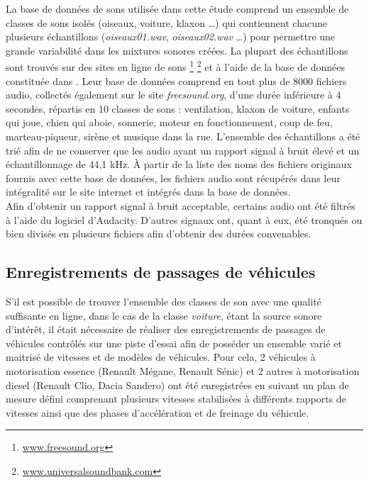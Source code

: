 La base de données de sons utilisée dans cette étude comprend un ensemble de classes de sons isolés (oiseaux, voiture, klaxon  \dots) qui contiennent chacune plusieurs échantillons (\textit{oiseaux01.wav}, \textit{oiseaux02.wav} \dots) pour permettre une grande variabilité dans les mixtures sonores créées. La plupart des échantillons sont trouvés sur des sites en ligne de sons \footnote{\url{www.freesound.org}} \footnote{\url{www.universalsoundbank.com}} et à l'aide de la base de données constituée dans  \cite{salamon_dataset_nodate}. Leur base de données comprend en tout plus de 8000 fichiers audio, collectés également sur le site \textit{freesound.org}, d'une durée inférieure à 4 secondes, répartis en 10 classes de sons : ventilation, klaxon de voiture, enfants qui joue, chien qui aboie, sonnerie, moteur en fonctionnement, coup de feu, marteau-piqueur, sirène et musique dans la rue. L'ensemble des échantillons a été trié afin de ne conserver que les audio ayant un rapport signal à bruit élevé et un échantillonnage de 44,1 kHz. \`A partir de la liste des noms des fichiers originaux fournis avec cette base de données, les fichiers audio sont récupérés dans leur intégralité sur le site internet et intégrés dans la base de données.\\
Afin d'obtenir un rapport signal à bruit acceptable, certains audio ont été filtrés à l'aide du logiciel d'Audacity. D'autres signaux ont, quant à eux, été tronqués ou bien divisés en plusieurs fichiers afin d'obtenir des durées convenables.

\subsection{Enregistrements de passages de véhicules}
S'il est possible de trouver l'ensemble des classes de son avec une qualité suffisante en ligne, dans le cas de la classe \textit{voiture}, étant la source sonore d'intérêt, il était nécessaire de réaliser des enregistrements de passages de véhicules contrôlés sur une piste d'essai afin de posséder un ensemble varié et maitrisé de vitesses et de modèles de véhicules. Pour cela, 2 véhicules à motorisation essence (Renault Mégane, Renault Sénic) et 2 autres à motorisation diesel (Renault Clio, Dacia Sandero) ont été enregistrées en suivant un plan de mesure défini comprenant plusieurs vitesses stabilisées à différents rapports de vitesses ainsi que des phases d'accélération et de freinage du véhicule.



